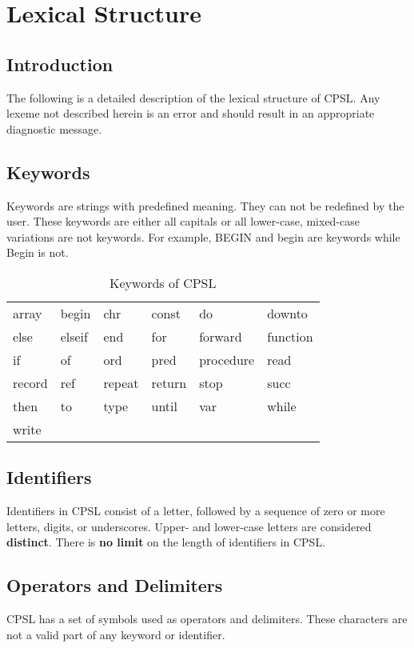 \documentclass{book}
\begin{document}
\chapter{Lexical Structure}
\section{Introduction}
The following is a detailed description of the lexical structure of CPSL.
Any lexeme not described herein is an error and should result in an appropriate diagnostic message.
\section{Keywords}
Keywords are strings with predefined meaning.  
They can not be redefined by the user.
These keywords are either all capitals or all lower-case, 
mixed-case variations are not keywords.
For example, BEGIN and begin are keywords while Begin is not.

\begin{table}[h!]
\begin{center}
\begin{tabular}{llllll}
array & begin & chr & const & do & downto \\
else & elseif & end & for & forward & function \\
if & of & ord & pred & procedure & read \\
record & ref & repeat & return & stop & succ \\
then & to & type & until & var & while \\
write \\
\end{tabular}
\end{center}
\caption{Keywords of CPSL}
\end{table}
\section{Identifiers}
Identifiers in CPSL consist of a letter, followed by a sequence of zero or more letters, digits, or underscores.
Upper- and lower-case letters are considered \textbf{distinct}.
There is \textbf{no limit} on the length of identifiers in CPSL.

\section{Operators and Delimiters}
CPSL has a set of symbols used as operators and delimiters.
These characters are not a valid part of any keyword or identifier.
\end{document}
